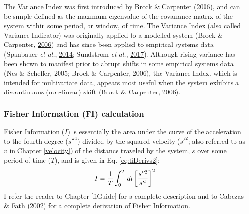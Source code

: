 \documentclass[print]{nuthesis}
\begin{document}
The Variance Index was first introduced by Brock \& Carpenter (\protect\hyperlink{ref-brock_variance_2006}{2006}), and can be simple defined as the maximum eigenvalue of the covariance matrix of the system within some period, or window, of time. The Variance Index (also called Variance Indicator) was originally applied to a modelled system (Brock \& Carpenter, \protect\hyperlink{ref-brock_variance_2006}{2006}) and has since been applied to empirical systems data (Spanbauer \emph{et al.}, \protect\hyperlink{ref-spanbauer_prolonged_2014}{2014}; Sundstrom \emph{et al.}, \protect\hyperlink{ref-sundstrom2017detecting}{2017}). Although rising variance has been shown to manifest prior to abrupt shifts in some empirical systems data (Nes \& Scheffer, \protect\hyperlink{ref-van2005implications}{2005}; Brock \& Carpenter, \protect\hyperlink{ref-brock_variance_2006}{2006}), the Variance Index, which is intended for multivariate data, appears most useful when the system exhibits a discontinuous (non-linear) shift (Brock \& Carpenter, \protect\hyperlink{ref-brock_variance_2006}{2006}).

\hypertarget{fisher-information-fi-calculation}{%
\subsubsection{Fisher Information (FI) calculation}\label{fisher-information-fi-calculation}}

Fisher Information (\(I\)) is essentially the area under the curve of the acceleration to the fourth degree (\(s''^4\)) divided by the squared velocity (\(s'^2\); also referred to as \(v\) in Chapter \ref{velocity}) of the distance traveled by the system, \(s\) over some period of time (\(T\)), and is given in Eq. \eqref{eq:fiDerivs2}:
\begin{equation}   
    I = \frac{1}{T} \int_0^T dt\left[\frac{s''^2}{s'^4}\right]^2 \\  
  \label{eq:fiDerivs2}  
\end{equation}
I refer the reader to Chapter \ref{fiGuide} for a complete description and to Cabezas \& Fath (\protect\hyperlink{ref-cabezas_towards_2002}{2002}) for a complete derivation of Fisher Information.
\end{document}
